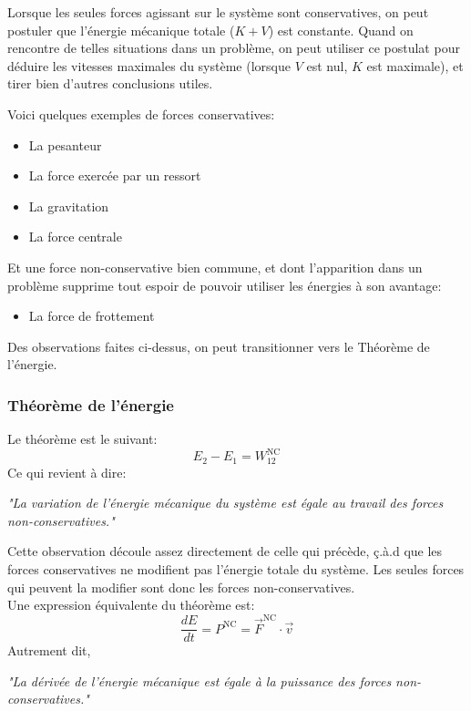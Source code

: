 \documentclass{article}
\numberwithin{equation}{section}
\begin{document}
Lorsque les seules forces agissant sur le système sont conservatives, on peut postuler que l'énergie mécanique totale (\(K + V\)) est constante. Quand on rencontre de telles situations dans un problème, on peut utiliser ce postulat pour déduire les vitesses maximales du système (lorsque \(V\) est nul, \(K\) est maximale), et tirer bien d'autres conclusions utiles.

Voici quelques exemples de forces conservatives:
\begin{itemize}
	\item La pesanteur
	\item La force exercée par un ressort
	\item La gravitation
	\item La force centrale %
\end{itemize}
Et une force non-conservative bien commune, et dont l'apparition dans un problème supprime tout espoir de pouvoir utiliser les énergies à son avantage:
\begin{itemize}
	\item La force de frottement
\end{itemize}

Des observations faites ci-dessus, on peut transitionner vers le Théorème de l'énergie.

\subsubsection{Théorème de l'énergie}
Le théorème est le suivant:
\begin{equation} \label{eq:thmenergie}
	\boxed{ E_2 - E_1 = W_{12}^\text{NC} }
\end{equation}
Ce qui revient à dire:
\begin{center}
	\emph{"La variation de l'énergie mécanique du système est égale au travail des forces non-conservatives."}
\end{center}
Cette observation découle assez directement de celle qui précède, ç.à.d que les forces conservatives ne modifient pas l'énergie totale du système. Les seules forces qui peuvent la modifier sont donc les forces non-conservatives. \\

Une expression équivalente du théorème est:
\begin{equation}
	\boxed{ \frac{dE}{dt} = P^\text{NC} = \vec F^\text{NC} \cdot \vec v }
\end{equation}
Autrement dit,
\begin{center}
	\emph{"La dérivée de l'énergie mécanique est égale à la puissance des forces non-conservatives."}
\end{center}
\end{document}
